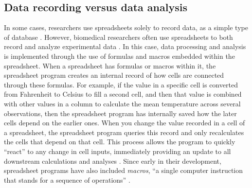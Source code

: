 \documentclass[]{tufte-book}
\begin{document}
\subsection{Data recording versus data analysis}\label{data-recording-versus-data-analysis}

In some cases, researchers use spreadsheets solely to record data, as a simple
type of database \citep{birch2018future}. However, biomedical researchers often use
spreadsheets to both record and analyze experimental data \citep{anderson2007issues}.
In this case, data processing and analysis is implemented through the use of
formulas and macros embedded within the spreadsheet. When a spreadsheet has
formulas or macros within it, the spreadsheet program creates an internal record
of how cells are connected through these formulas. For example, if the value in
a specific cell is converted from Fahrenheit to Celsius to fill a second cell,
and then that value is combined with other values in a column to calculate the
mean temperature across several observations, then the spreadsheet program has
internally saved how the later cells depend on the earlier ones. When you change
the value recorded in a cell of a spreadsheet, the spreadsheet program queries
this record and only recalculates the cells that depend on that cell. This
process allows the program to quickly ``react'' to any change in cell inputs,
immediately providing an update to all downstream calculations and analyses
\citep{levy1984spreadsheet}. Since early in their development, spreadsheet programs
have also included \emph{macros}, ``a single computer instruction that stands for a
sequence of operations'' \citep{creeth1985microcomputer}.
\end{document}
